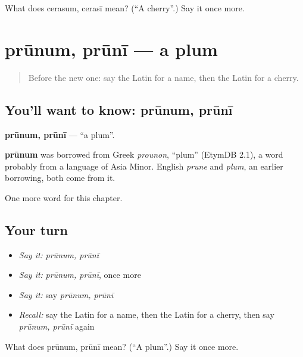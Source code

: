 \begin{tcolorbox}[breakable,colback=teal!4,colframe=teal!35!black,title={Before you move on}]
What does cerasum, cerasī mean? (\textquotedblleft{}A cherry\textquotedblright{}.) Say it once more.
\end{tcolorbox}
\section[prūnum, prūnī]{prūnum, prūnī — a plum}

\label{lesson:LA-C279-prunum}



\begin{quote}
Before the new one: say the Latin for a name, then the Latin for a cherry.
\end{quote}

\subsection*{You'll want to know: prūnum, prūnī}
\textbf{prūnum, prūnī} — \textquotedblleft{}a plum\textquotedblright{}.

\begin{cousinweb}
\textbf{prūnum} was borrowed from Greek \emph{prounon}, \textquotedblleft{}plum\textquotedblright{} (EtymDB 2.1), a word probably from a language of Asia Minor. English \emph{prune} and \emph{plum}, an earlier borrowing, both come from it.
\end{cousinweb}

\begin{grammarlens}[title={What you've built}]
One more word for this chapter.
\end{grammarlens}

\subsection*{Your turn}
\begin{itemize}
\raggedright
  \item \emph{Say it:} \emph{prūnum, prūnī}
  \item \emph{Say it:} \emph{prūnum, prūnī}, once more
  \item \emph{Say it:} say \emph{prūnum, prūnī}
  \item \emph{Recall:} say the Latin for a name, then the Latin for a cherry, then say \emph{prūnum, prūnī} again
\end{itemize}

\begin{tcolorbox}[breakable,colback=teal!4,colframe=teal!35!black,title={Before you move on}]
What does prūnum, prūnī mean? (\textquotedblleft{}A plum\textquotedblright{}.) Say it once more.
\end{tcolorbox}
